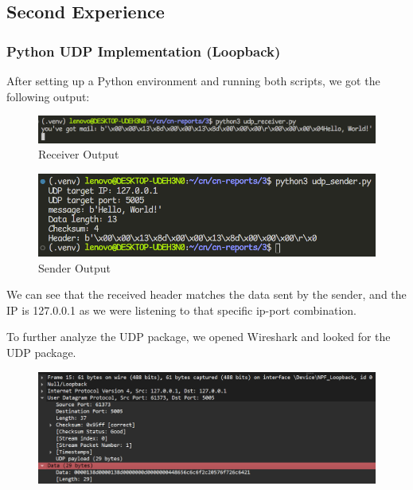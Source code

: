 \subsection{Second Experience}

\subsubsection{Python UDP Implementation (Loopback)}

After setting up a Python environment and running both scripts, we got the
following output:

\begin{figure}[htbp]
	\centering
	\includegraphics[width=1\linewidth]{img/second_exp/1.png}
	\caption{Receiver Output}\label{fig:2_1}
\end{figure}

\begin{figure}[htbp]
	\centering
	\includegraphics[width=1\linewidth]{img/second_exp/2.png}
	\caption{Sender Output}\label{fig:2_2}
\end{figure}

We can see that the received header matches the data sent by the sender, and
the IP is 127.0.0.1 as we were listening to that specific ip-port combination.

To further analyze the UDP package, we opened Wireshark and looked for the UDP
package.

\begin{figure}[htbp]
	\centering
	\includegraphics[width=1\linewidth]{img/second_exp/3.png}
	\caption{}\label{fig:2_3}
\end{figure}

